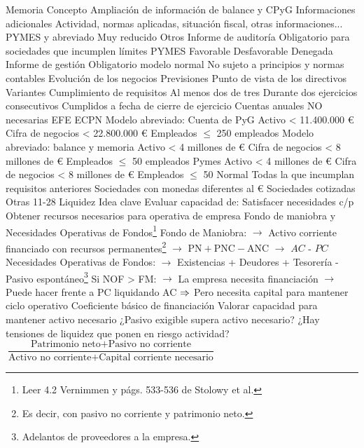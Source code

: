 \documentclass{nuevotema}
\begin{document}
\begin{esquemal}
		\2[V] Memoria
			\3 Concepto
				\4 Ampliación de información de balance y CPyG
				\4 Informaciones adicionales
				\4 Actividad, normas aplicadas, situación fiscal, otras informaciones...
			\3 PYMES y abreviado
				\4 Muy reducido
		\2 Otros
			\3 Informe de auditoría
				\4 Obligatorio para sociedades que incumplen límites PYMES
				\4 Favorable
				\4 Desfavorable
				\4 Denegada
			\3 Informe de gestión
				\4 Obligatorio modelo normal
				\4 No sujeto a principios y normas contables
				\4 Evolución de los negocios
				\4 Previsiones
				\4 Punto de vista de los directivos
		\2 Variantes
			\3 Cumplimiento de requisitos
				\4 Al menos dos de tres
				\4 Durante dos ejercicios consecutivos
				\4 Cumplidos a fecha de cierre de ejercicio
			\3 Cuentas anuales NO necesarias
				\4 EFE
				\4 ECPN
			\3 Modelo abreviado: Cuenta de PyG
				\4[i)] Activo < 11.400.000 €
				\4[ii)] Cifra de negocios < 22.800.000 €
				\4[iii)] Empleados $\leq$ 250 empleados
			\3 Modelo abreviado: balance y memoria
				\4[i)] Activo < 4 millones de €
				\4[ii)] Cifra de negocios < 8 millones de €
				\4[iii)] Empleados $\leq$ 50 empleados
			\3 Pymes
				\4[i)] Activo < 4 millones de €
				\4[ii)] Cifra de negocios < 8 millones de €
				\4[iii)] Empleados $\leq$ 50
			\3 Normal
				\4 Todas la que incumplan requisitos anteriores
				\4 Sociedades con monedas diferentes al €
				\4 Sociedades cotizadas
				\4 Otras
	\1  11-28
		\2 Liquidez
			\3 Idea clave
				\4 Evaluar capacidad de:
				\4[] Satisfacer necesidades c/p
				\4[] Obtener recursos necesarios para operativa de empresa
			\3 Fondo de maniobra y Necesidades Operativas de Fondos\footnote{Leer 4.2 Vernimmen y págs. 533-536 de Stolowy et al.}
				\4 Fondo de Maniobra:
				\4[] $\to$ Activo corriente financiado con recursos permanentes\footnote{Es decir, con pasivo no corriente y patrimonio neto.}
				\4[] $\to$ $\text{PN}+\text{PNC}-\text{ANC}$
				\4[] $\to$ $AC$ - $PC$
				\4 Necesidades Operativas de Fondos:
				\4[] $\to$ Existencias + Deudores + Tesorería - Pasivo espontáneo\footnote{Adelantos de proveedores a la empresa.}
				\4 Si NOF > FM:
				\4[] $\to$ La empresa necesita financiación
				\4[] $\to$ Puede hacer frente a PC liquidando AC
				\4[] $\Rightarrow$ Pero necesita capital para mantener ciclo operativo
			\3 Coeficiente básico de financiación
				\4 Valorar capacidad para mantener activo necesario
				\4[] ¿Pasivo exigible supera activo necesario?
				\4[] ¿Hay tensiones de liquidez que ponen en riesgo actividad?
				\4 $\dfrac{\text{Patrimonio neto}+\text{Pasivo no corriente}}{\text{Activo no corriente}+\text{Capital corriente necesario}}$

\end{esquemal}
\end{document}
